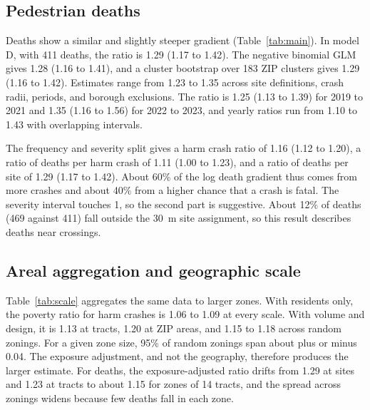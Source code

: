 \documentclass[10pt,twocolumn]{article}
\begin{document}
\subsection{Pedestrian deaths}
Deaths show a similar and slightly steeper gradient (Table~\ref{tab:main}). In model D, with 411 deaths, the ratio is 1.29 (1.17 to 1.42). The negative binomial GLM gives 1.28 (1.16 to 1.41), and a cluster bootstrap over 183 ZIP clusters gives 1.29 (1.16 to 1.42). Estimates range from 1.23 to 1.35 across site definitions, crash radii, periods, and borough exclusions. The ratio is 1.25 (1.13 to 1.39) for 2019 to 2021 and 1.35 (1.16 to 1.56) for 2022 to 2023, and yearly ratios run from 1.10 to 1.43 with overlapping intervals.

The frequency and severity split gives a harm crash ratio of 1.16 (1.12 to 1.20), a ratio of deaths per harm crash of 1.11 (1.00 to 1.23), and a ratio of deaths per site of 1.29 (1.17 to 1.42). About 60\% of the log death gradient thus comes from more crashes and about 40\% from a higher chance that a crash is fatal. The severity interval touches 1, so the second part is suggestive. About 12\% of deaths (469 against 411) fall outside the 30~m site assignment, so this result describes deaths near crossings.

\subsection{Areal aggregation and geographic scale}
\begin{table}[!t]
\centering
\caption{Poverty rate ratio per 10 percentage points at different zone scales. Poisson regression. ``Residents only'' uses log population, commuting shares, and borough. ``With exposure'' adds log crossing volume and volume-weighted street width, lanes, and speed. Random zones show the median over 100 draws.}
\label{tab:scale}
\small\setlength{\tabcolsep}{4pt}

\end{table}

Table~\ref{tab:scale} aggregates the same data to larger zones. With residents only, the poverty ratio for harm crashes is 1.06 to 1.09 at every scale. With volume and design, it is 1.13 at tracts, 1.20 at ZIP areas, and 1.15 to 1.18 across random zonings. For a given zone size, 95\% of random zonings span about plus or minus 0.04. The exposure adjustment, and not the geography, therefore produces the larger estimate. For deaths, the exposure-adjusted ratio drifts from 1.29 at sites and 1.23 at tracts to about 1.15 for zones of 14 tracts, and the spread across zonings widens because few deaths fall in each zone.
\end{document}
